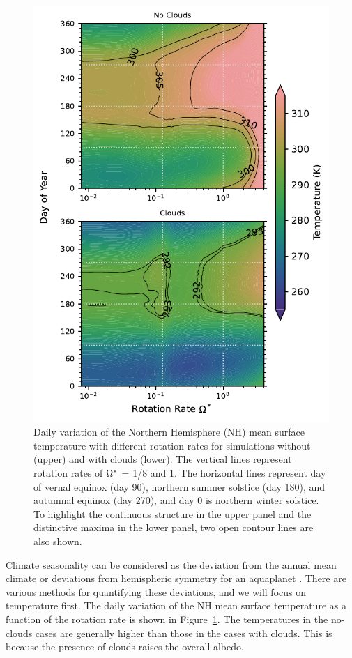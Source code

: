 \begin{figure}[tb]
   \centering
   \includegraphics[width=\columnwidth]{plots/7-Temp_NH.pdf}
   \caption{Daily variation of the Northern Hemisphere (NH) mean surface temperature with different rotation rates for simulations without (upper) and with clouds (lower). The vertical lines represent rotation rates of $\Omega^*$ = 1/8 and 1. The horizontal lines represent day of vernal equinox (day 90), northern summer solstice (day 180), and autumnal equinox (day 270), and day 0 is northern winter solstice. To highlight the continuous structure in the upper panel and the distinctive maxima in the lower panel, two open contour lines are also shown.}
   \label{fig:T_diff1}
\end{figure}

Climate seasonality can be considered as the deviation from the annual mean climate or deviations from hemispheric symmetry for an aquaplanet \citep{guendelman2022-Key}. There are various methods for quantifying these deviations, and we will focus on temperature first. The daily variation of the NH mean surface temperature as a function of the rotation rate is shown in Figure~\ref{fig:T_diff1}. The temperatures in the no-clouds cases are generally higher than those in the cases with clouds. This is because the presence of clouds raises the overall albedo. 

